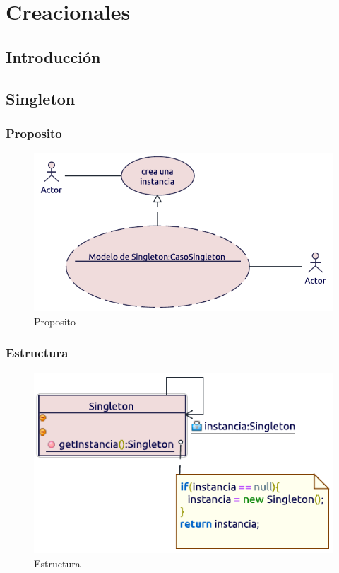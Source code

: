 \chapter{Creacionales}

\section{Introducción}

\newpage

\section{Singleton}

\subsection{Proposito}
\begin{figure}[h!]
	\centering
	\includegraphics[width=0.7\linewidth]{Diseno/Creacionales/imgs/proposito}
	\caption{Proposito}
\end{figure}


\subsection{Estructura}
\begin{figure}[h!]
	\centering
	\includegraphics[width=0.7\linewidth]{Diseno/Creacionales/imgs/estructura}
	\caption{Estructura}
\end{figure}


